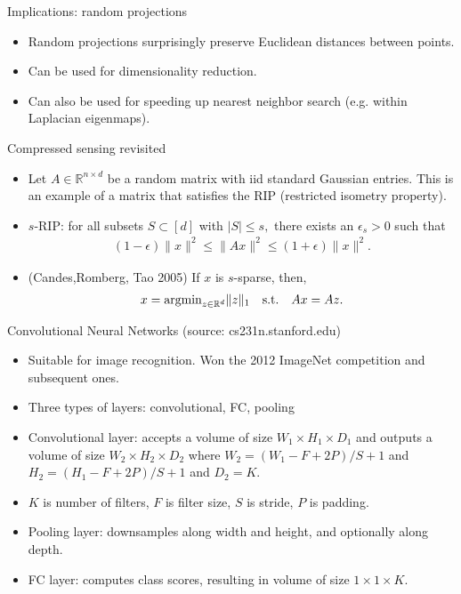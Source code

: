 \documentclass[final]{beamer}
\begin{document}
\begin{frame}{Implications: random projections}
	\begin{itemize}
		\item Random projections surprisingly preserve Euclidean distances between points.
		\pause 
		\item Can be used for dimensionality reduction.
		\pause
		\item Can also be used for speeding up nearest neighbor search (e.g. within Laplacian eigenmaps).
		\pause
		
			
	\end{itemize}
\end{frame}
\begin{frame}{Compressed sensing revisited}
	\begin{itemize}
	\item Let $A \in \mathbb{R}^{n\times d}$ be a random matrix with iid standard Gaussian entries. This is an example of a matrix that satisfies the RIP (restricted isometry property).
	\pause 
	\item $s$-RIP: for all subsets $S \subset [d]$ with $|S| \leq s,$ there exists an $\epsilon_s > 0$ such that
		\begin{align}
		(1-\epsilon)\|x\|^2 \leq \|Ax\|^2 \leq (1+\epsilon)\|x\|^2.
	\end{align}
	\pause
\item (Candes,Romberg, Tao 2005) If $x$ is $s$-sparse, then,
	\begin{align}
		x = {\rm argmin}_{z \in \mathbb{R}^d} \|z\|_1 \quad {\rm s.t.} \quad Ax = Az.
	\end{align}
	\end{itemize}
\end{frame}
\begin{frame}{Convolutional Neural Networks (source: cs231n.stanford.edu)}
	\begin{itemize}
		\item Suitable for image recognition. Won the 2012 ImageNet competition and subsequent ones.
		\item Three types of layers: convolutional, FC, pooling
		\item Convolutional layer: accepts a volume of size $W_1 \times H_1 \times D_1$ and outputs a volume of size $W_2 \times H_2 \times D_2$ where $W_2 = (W_1 - F + 2P)/S + 1$ and $H_2 = (H_1 - F + 2P)/S + 1$ and $D_2 = K$.

		\item $K$ is number of filters, $F$ is filter size, $S$ is stride, $P$ is padding.
		\item Pooling layer: downsamples along width and height, and optionally along depth.
		\item FC layer: computes class scores, resulting in volume of size $1 \times 1 \times K$.

	
	\end{itemize}
\end{frame}
\end{document}
